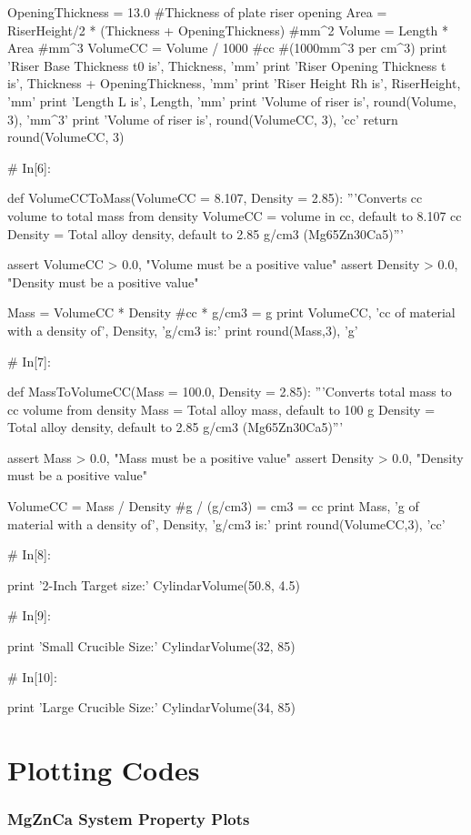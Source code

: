 \documentclass[a4paper,8pt]{article}
\begin{document}
\begin{python}
OpeningThickness = 13.0 #Thickness of plate riser opening
Area = RiserHeight/2 * (Thickness + OpeningThickness) #mm^2
Volume = Length * Area #mm^3
VolumeCC = Volume / 1000 #cc #(1000mm^3 per cm^3)
print 'Riser Base Thickness t0 is', Thickness, 'mm'
print 'Riser Opening Thickness t is', Thickness + OpeningThickness, 'mm'
print 'Riser Height Rh is', RiserHeight, 'mm'
print 'Length L is', Length, 'mm'
print 'Volume of riser is', round(Volume, 3), 'mm^3'
print 'Volume of riser is', round(VolumeCC, 3), 'cc'
return round(VolumeCC, 3)


# In[6]:

def VolumeCCToMass(VolumeCC = 8.107, Density = 2.85):
'''Converts cc volume to total mass from density 
VolumeCC = volume in cc, default to 8.107 cc
Density = Total alloy density, default to 2.85 g/cm3 (Mg65Zn30Ca5)'''

assert VolumeCC > 0.0, "Volume must be a positive value"
assert Density > 0.0, "Density must be a positive value"

Mass = VolumeCC * Density #cc * g/cm3 = g
print VolumeCC, 'cc of material with a density of', Density, 'g/cm3 is:'
print round(Mass,3), 'g'


# In[7]:

def MassToVolumeCC(Mass = 100.0, Density = 2.85):
'''Converts total mass to cc volume from density 
Mass = Total alloy mass, default to 100 g
Density = Total alloy density, default to 2.85 g/cm3 (Mg65Zn30Ca5)'''

assert Mass > 0.0, "Mass must be a positive value"
assert Density > 0.0, "Density must be a positive value"

VolumeCC = Mass / Density #g / (g/cm3) = cm3 = cc
print Mass, 'g of material with a density of', Density, 'g/cm3 is:'
print round(VolumeCC,3), 'cc'


# In[8]:

print '2-Inch Target size:'
CylindarVolume(50.8, 4.5)


# In[9]:

print 'Small Crucible Size:'
CylindarVolume(32, 85)


# In[10]:

print 'Large Crucible Size:'
CylindarVolume(34, 85)

\end{python}

\newpage
\section{Plotting Codes}
\subsubsection{MgZnCa System Property Plots}
\end{document}
